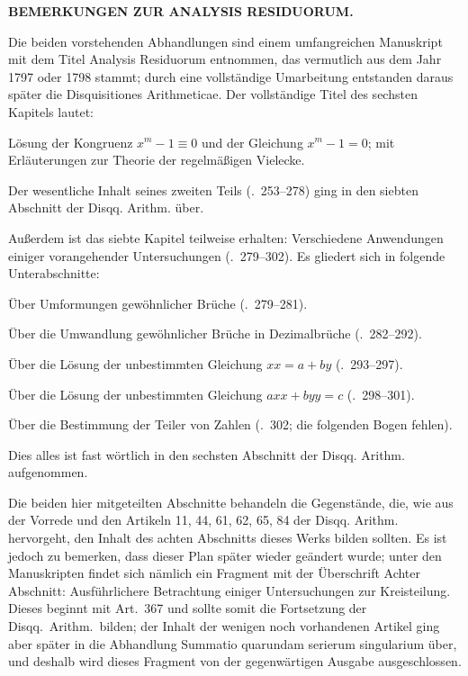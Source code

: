 \par\bigskip{}
\begin{center}\large\bfseries BEMERKUNGEN ZUR ANALYSIS RESIDUORUM.\end{center}
\renewcommand{\BookRunningTitle}{Historische Herausgeberbemerkungen zur Analysis Residuorum}

Die beiden vorstehenden Abhandlungen sind einem umfangreichen Manuskript mit dem Titel Analysis Residuorum entnommen, das vermutlich aus dem Jahr 1797 oder 1798 stammt; durch eine vollständige Umarbeitung entstanden daraus später die Disquisitiones Arithmeticae. Der vollständige Titel des sechsten Kapitels lautet:

Lösung der Kongruenz $x^m-1\equiv0$ und der Gleichung $x^m-1=0$; mit Erläuterungen zur Theorie der regelmäßigen Vielecke.

Der wesentliche Inhalt seines zweiten Teils (\textsection\textsection.\ 253--278) ging in den siebten Abschnitt der Disqq. Arithm. über.

Außerdem ist das siebte Kapitel teilweise erhalten: Verschiedene Anwendungen einiger vorangehender Untersuchungen (\textsection\textsection.\ 279--302). Es gliedert sich in folgende Unterabschnitte:

Über Umformungen gewöhnlicher Brüche (\textsection\textsection.\ 279--281).

Über die Umwandlung gewöhnlicher Brüche in Dezimalbrüche (\textsection\textsection.\ 282--292).

Über die Lösung der unbestimmten Gleichung $xx=a+by$ (\textsection\textsection.\ 293--297).

Über die Lösung der unbestimmten Gleichung $axx+byy=c$ (\textsection\textsection.\ 298--301).

Über die Bestimmung der Teiler von Zahlen (\textsection.\ 302; die folgenden Bogen fehlen).

Dies alles ist fast wörtlich in den sechsten Abschnitt der Disqq. Arithm. aufgenommen.

Die beiden hier mitgeteilten Abschnitte behandeln die Gegenstände, die, wie aus der Vorrede und den Artikeln 11, 44, 61, 62, 65, 84 der Disqq. Arithm. hervorgeht, den Inhalt des achten Abschnitts dieses Werks bilden sollten. Es ist jedoch zu bemerken, dass dieser Plan später wieder geändert wurde; unter den Manuskripten findet sich nämlich ein Fragment mit der Überschrift Achter Abschnitt: Ausführlichere Betrachtung einiger Untersuchungen zur Kreisteilung. Dieses
beginnt mit Art.\ 367 und sollte somit die Fortsetzung der Disqq.\ Arithm.\ bilden; der Inhalt der wenigen noch vorhandenen Artikel ging aber später in die Abhandlung Summatio quarundam serierum singularium über, und deshalb wird dieses Fragment von der gegenwärtigen Ausgabe ausgeschlossen.

